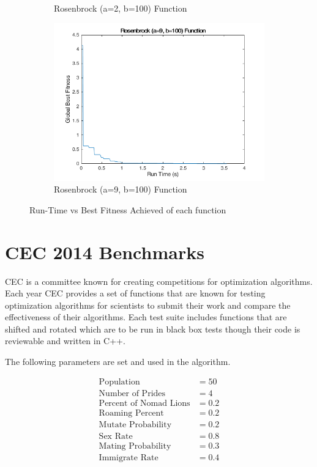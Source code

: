 \begin{figure}
\begin{subfigure}[b]{0.4\textwidth}
    \caption{Rosenbrock (a=2, b=100) Function}
  \end{subfigure}
  \begin{subfigure}[b]{0.4\textwidth}
    \includegraphics[width=\textwidth]{img/summary/rosenbrock9-100}
    \caption{Rosenbrock (a=9, b=100) Function}
  \end{subfigure}
  \caption{Run-Time vs Best Fitness Achieved of each function}
\end{figure}

\clearpage

\section{CEC 2014 Benchmarks}

CEC is a committee known for creating competitions for optimization algorithms. Each year CEC provides a set of functions that are known for testing optimization algorithms for scientists to submit their work and compare the effectiveness of their algorithms. Each test suite includes functions that are shifted and rotated which are to be run in black box tests though their code is reviewable and written in C++.

The following parameters are set and used in the algorithm.

\begin{align*}
\text{Population} &= 50\\
\text{Number of Prides} &= 4\\
\text{Percent of Nomad Lions} &= 0.2\\
\text{Roaming Percent} &= 0.2\\
\text{Mutate Probability} &= 0.2\\
\text{Sex Rate} &= 0.8\\
\text{Mating Probability} &= 0.3\\
\text{Immigrate Rate} &= 0.4\\
\end{align*}

